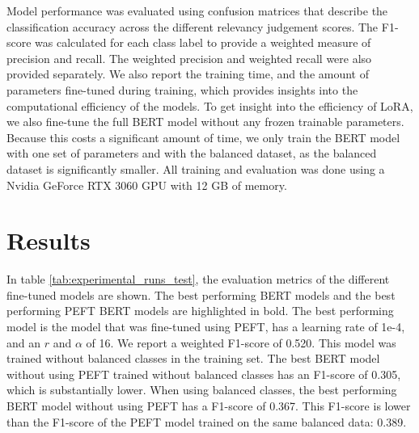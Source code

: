 \documentclass[sigconf, natbib=true]{acmart}
\begin{document}
Model performance was evaluated using confusion matrices that describe the classification accuracy across the different relevancy judgement scores.
The F1-score was calculated for each class label to provide a weighted measure of precision and recall.
The weighted precision and weighted recall were also provided separately.
We also report the training time, and the amount of parameters fine-tuned during training, which provides insights into the computational efficiency of the models. 
To get insight into the efficiency of LoRA, we also fine-tune the full BERT model without any frozen trainable parameters. 
Because this costs a significant amount of time, we only train the BERT model with one set of parameters and with the balanced dataset, as the balanced dataset is significantly smaller. 
All training and evaluation was done using a Nvidia GeForce RTX 3060 GPU with 12 GB of memory.

\section{Results}
In table \ref{tab:experimental_runs_test}, the evaluation metrics of the different fine-tuned models are shown. The best performing BERT models and the best performing PEFT BERT models are highlighted in bold.
The best performing model is the model that was fine-tuned using PEFT, has a learning rate of 1e-4, and an $r$ and $\alpha$ of 16. 
We report a weighted F1-score of 0.520. This model was trained without balanced classes in the training set. 
The best BERT model without using PEFT trained without balanced classes has an F1-score of 0.305, which is substantially lower. 
When using balanced classes, the best performing BERT model without using PEFT has a F1-score of 0.367. 
This F1-score is lower than the F1-score of the PEFT model trained on the same balanced data: 0.389.
\end{document}
